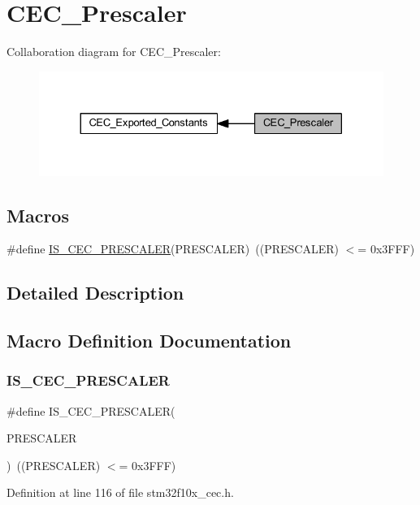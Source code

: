 \hypertarget{group___c_e_c___prescaler}{}\section{C\+E\+C\+\_\+\+Prescaler}
\label{group___c_e_c___prescaler}
Collaboration diagram for C\+E\+C\+\_\+\+Prescaler\+:
\nopagebreak
\begin{figure}[H]
\begin{center}
\leavevmode
\includegraphics[width=330pt]{group___c_e_c___prescaler}
\end{center}
\end{figure}
\subsection*{Macros}
\begin{DoxyCompactItemize}
\item 
\#define \hyperlink{group___c_e_c___prescaler_ga88ad62af56298609444942b8f05b6d23}{I\+S\+\_\+\+C\+E\+C\+\_\+\+P\+R\+E\+S\+C\+A\+L\+ER}(P\+R\+E\+S\+C\+A\+L\+ER)~((P\+R\+E\+S\+C\+A\+L\+ER) $<$= 0x3\+F\+F\+F)
\end{DoxyCompactItemize}


\subsection{Detailed Description}


\subsection{Macro Definition Documentation}
\mbox{\label{group___c_e_c___prescaler_ga88ad62af56298609444942b8f05b6d23}} 
\subsubsection{\texorpdfstring{I\+S\+\_\+\+C\+E\+C\+\_\+\+P\+R\+E\+S\+C\+A\+L\+ER}{IS\_CEC\_PRESCALER}}
{\footnotesize\ttfamily \#define I\+S\+\_\+\+C\+E\+C\+\_\+\+P\+R\+E\+S\+C\+A\+L\+ER(\begin{DoxyParamCaption}\item[{}]{P\+R\+E\+S\+C\+A\+L\+ER }\end{DoxyParamCaption})~((P\+R\+E\+S\+C\+A\+L\+ER) $<$= 0x3\+F\+F\+F)}



Definition at line 116 of file stm32f10x\+\_\+cec.\+h.

